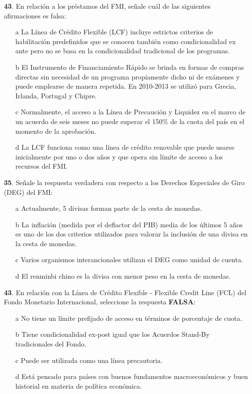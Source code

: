 \documentclass{nuevotema}
\begin{document}
\textbf{43}. En relación a los préstamos del FMI, señale cuál de las siguientes afirmaciones es falsa:

\begin{enumerate}
	\item[a] La Línea de Crédito Flexible (LCF) incluye estrictos criterios de habilitación predefinidos que se conocen también como condicionalidad ex ante pero no se basa en la condicionalidad tradicional de los programas.
	\item[b] El Instrumento de Financiamiento Rápido se brinda en formas de compras directas sin necesidad de un programa propiamente dicho ni de exámenes y puede emplearse de manera repetida. En 2010-2013 se utilizó para Grecia, Irlanda, Portugal y Chipre.
	\item[c] Normalmente, el acceso a la Línea de Precaución y Liquidez en el marco de un acuerdo de seis meses no puede superar el 150\% de la cuota del país en el momento de la aprobación.
	\item[d] La LCF funciona como una línea de crédito renovable que puede usarse inicialmente por uno o dos años y que opera sin límite de acceso a los recursos del FMI.
\end{enumerate}

\textbf{35}. Señale la respuesta verdadera con respecto a los Derechos Especiales de Giro (DEG) del FMI:

\begin{enumerate}
	\item[a] Actualmente, 5 divisas forman parte de la cesta de monedas.
	\item[b] La inflación (medida por el deflactor del PIB) media de los últimos 5 años es uno de los dos criterios utilizados para valorar la inclusión de una divisa en la cesta de monedas.
	\item[c] Varios organismos interancionales utilizan el DEG como unidad de cuenta.
	\item[d] El renminbi chino es la divisa con menor peso en la cesta de monedas.
\end{enumerate}

\textbf{43}. En relación con la Línea de Crédito Flexible - Flexible Credit Line (FCL) del Fondo Monetario Internacional, seleccione la respuesta \textbf{FALSA}:

\begin{enumerate}
	\item[a] No tiene un límite prefijado de acceso en términos de porcentaje de cuota.
	\item[b] Tiene condicionalidad ex-post igual que los Acuerdos Stand-By tradicionales del Fondo.
	\item[c] Puede ser utilizada como una línea precautoria.
	\item[d] Está pensado para países con buenos fundamentos macroeconómicos y buen historial en materia de política económica.
\end{enumerate}
\end{document}

